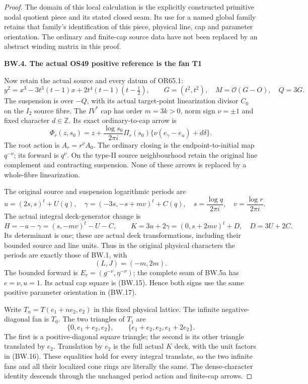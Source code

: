 \begin{proof}
The domain of this local calculation is the explicitly constructed
primitive nodal quotient piece and its stated closed seam. Its use
for a named global family retains that family's identification of
this piece, physical line, cap and parameter orientation. The
ordinary and finite-cap source data have not been replaced by
an abstract winding matrix in this proof.

\par

\medskip\noindent\textbf{BW.4. The actual OS49 positive reference is the fan T1}

\par\nobreak

Now retain the actual source and every datum of OR65.1:
\[
 y^2=x^3-3t^3(t-1)x+2t^4(t-1)(t-\tfrac12),\qquad
 G=(t^2,t^2),\quad M=\mathcal O(G-O),\quad Q=3G.
                                                        \tag{BW.14}
\]
The suspension is over \(-Q\), with its actual target-point
linearization divisor \(C_0\) on the \(I_2\) source fibre. The
\(IV^*\) cap has order \(m=3k>0\), norm sign \(\nu=\pm1\) and
fixed character \(d\in\mathbb Z\). Its exact ordinary-to-cap
arrow is
\[
 \Phi_r(z,s_0)=z+\frac{\log s_0}{2\pi i}\Pi_r(s_0)
                 \{\nu(e_\gamma-e_u)+d\delta\}.
                                                        \tag{BW.15}
\]
The root action is \(A_r=r^\nu A_0\). The ordinary closing is
the endpoint-to-initial map \(q^{-\nu}\); its forward is \(q^\nu\).
On the type-II source neighbourhood retain the original line
complement and contracting suspension. None of these arrows
is replaced by a whole-fibre linearization.

The original source and suspension logarithmic periods are
\[
 u=(2s,s)^t+U(q),\quad
 \gamma=(-3s,-s+mv)^t+C(q),\quad
 s=\frac{\log q}{2\pi i},\quad v=\frac{\log r}{2\pi i}.
\]
The actual integral deck-generator change is
\[
 H=-u-\gamma=(s,-mv)^t-U-C,\qquad
 K=3u+2\gamma=(0,s+2mv)^t+D,\quad D=3U+2C.
                                                        \tag{BW.16}
\]
Its determinant is one; these are actual deck transformations,
including their bounded source and line units. Thus in the
original physical characters the periods are exactly those of
BW.1, with
\[
                   (L,J)=(-m,2m).                    \tag{BW.17}
\]
The bounded forward is \(E_r=(g^{-\nu},\eta^{-\nu})\);
the complete seam of BW.5a has \(e=\nu,u=1\). Its actual cap
square is (BW.15). Hence both signs use the same positive
parameter orientation in (BW.17).

Write \(T_n=T(e_1+ne_2,e_2)\) in this fixed physical lattice.
The infinite negative-diagonal fan is \(T_0\). The two triangles
of \(T_1\) are
\[
 \{0,e_1+e_2,e_2\},\qquad
 \{e_1+e_2,e_2,e_1+2e_2\}.
\]
The first is a positive-diagonal square triangle; the second
is its other triangle translated by \(e_2\). Translation by
\(e_2\) is the full actual \(K\) deck, with the unit factors in
(BW.16). These equalities hold for every integral translate,
so the two infinite fans and all their localized cone rings
are literally the same. The dense-character identity descends
through the unchanged period action and finite-cap arrows.


\end{proof}
